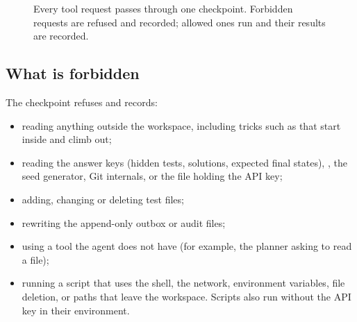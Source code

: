 \documentclass{article}
\newcommand{\code}[1]{\texttt{\detokenize{#1}}}
\begin{document}
\begin{figure}[htbp]
\centering
{}
\caption{Every tool request passes through one checkpoint. Forbidden requests are refused and recorded; allowed ones run and their results are recorded.}
\label{fig:dispatch}
\end{figure}

\subsection{What is forbidden}

The checkpoint refuses and records:
\begin{itemize}
  \item reading anything outside the workspace, including tricks such as \code{data/../../secrets} that start inside and climb out;
  \item reading the answer keys (hidden tests, solutions, expected final states), \code{facts.json}, the seed generator, Git internals, or the \code{.env} file holding the API key;
  \item adding, changing or deleting test files;
  \item rewriting the append-only outbox or audit files;
  \item using a tool the agent does not have (for example, the planner asking to read a file);
  \item running a script that uses the shell, the network, environment variables, file deletion, or paths that leave the workspace. Scripts also run without the API key in their environment.
\end{itemize}
\end{document}
